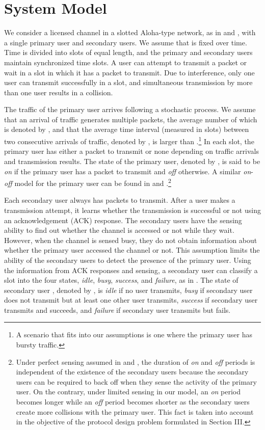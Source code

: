 \documentclass[12pt,draftclsnofoot,onecolumn]{IEEEtran}
\begin{document}
\section{System Model}

We consider a licensed channel in a slotted Aloha-type network, as in \cite{park} and \cite{ma},
with a single primary user and  secondary users. We assume that 
is fixed over time. Time is divided into slots
of equal length,
and the primary and secondary users maintain synchronized time slots.
A user can attempt to transmit a packet or wait in a slot in which it has a packet to transmit.
Due to interference, only one user can transmit successfully in a slot, and
simultaneous transmission by more than one user results in a collision.

The traffic of the primary user arrives following a stochastic process.
We assume that an arrival of traffic generates multiple packets, the
average number of which is denoted by , and that
the average time interval (measured in slots) between two consecutive arrivals of traffic,
denoted by , is larger than .\footnote{A scenario that fits into our assumptions
is one where the primary user has bursty traffic.}
In each slot, the primary user has either a packet to transmit or none depending on
traffic arrivals and transmission results.
The state of the primary user, denoted by , is said to be \emph{on} if the primary user
has a packet to transmit and \emph{off} otherwise. A similar \emph{on}-\emph{off} model for
the primary user can be found in \cite{chou} and \cite{hkim}.\footnote{Under
perfect sensing assumed in \cite{chou} and \cite{hkim}, the
duration of \emph{on} and \emph{off} periods is independent of the existence
of the secondary users because the secondary users can be required to back off when
they sense the activity of the primary user.
On the contrary, under limited sensing in our model, an \emph{on}
period becomes longer while an \emph{off} period becomes shorter as the secondary users
create more collisions with the primary user. This fact is
taken into account in the objective of the protocol design problem formulated in Section III.}

Each secondary user always has packets to transmit.
After a user makes a transmission attempt, it learns whether the transmission is
successful or not using an acknowledgement (ACK) response.
The secondary users have the sensing ability to find out whether the channel is accessed
or not while they wait. However, when the channel is sensed busy, they do not
obtain information about whether the primary user accessed the channel or not.
This assumption limits the ability of the secondary users to detect the presence
of the primary user. Using the information from ACK responses and sensing,
a secondary user can classify a slot into the four states, \emph{idle}, \emph{busy}, \emph{success}, and \emph{failure},
as in \cite{hamed}. The state of secondary user , denoted by ,
is \emph{idle} if no user transmits, \emph{busy} if secondary user 
does not transmit but at least one other user transmits, \emph{success} if
secondary user  transmits and succeeds, and \emph{failure} if secondary user  transmits
but fails.
\end{document}
